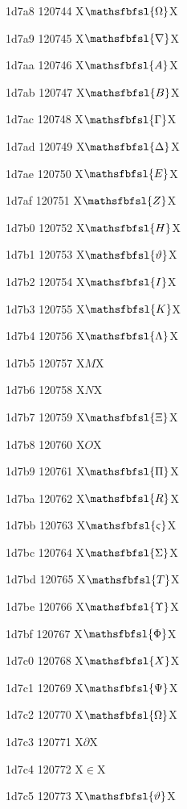 \documentclass[11pt]{article}
\begin{document}
1d7a8 120744 X{\ensuremath{\mathsfbfsl{\Omega}}}X

1d7a9 120745 X{\ensuremath{\mathsfbfsl{\nabla}}}X

1d7aa 120746 X{\ensuremath{\mathsfbfsl{A}}}X

1d7ab 120747 X{\ensuremath{\mathsfbfsl{B}}}X

1d7ac 120748 X{\ensuremath{\mathsfbfsl{\Gamma}}}X

1d7ad 120749 X{\ensuremath{\mathsfbfsl{\Delta}}}X

1d7ae 120750 X{\ensuremath{\mathsfbfsl{E}}}X

1d7af 120751 X{\ensuremath{\mathsfbfsl{Z}}}X

1d7b0 120752 X{\ensuremath{\mathsfbfsl{H}}}X

1d7b1 120753 X{\ensuremath{\mathsfbfsl{\vartheta}}}X

1d7b2 120754 X{\ensuremath{\mathsfbfsl{I}}}X

1d7b3 120755 X{\ensuremath{\mathsfbfsl{K}}}X

1d7b4 120756 X{\ensuremath{\mathsfbfsl{\Lambda}}}X

1d7b5 120757 X{\ensuremath{M}}X

1d7b6 120758 X{\ensuremath{N}}X

1d7b7 120759 X{\ensuremath{\mathsfbfsl{\Xi}}}X

1d7b8 120760 X{\ensuremath{O}}X

1d7b9 120761 X{\ensuremath{\mathsfbfsl{\Pi}}}X

1d7ba 120762 X{\ensuremath{\mathsfbfsl{R}}}X

1d7bb 120763 X{\ensuremath{\mathsfbfsl{\varsigma}}}X

1d7bc 120764 X{\ensuremath{\mathsfbfsl{\Sigma}}}X

1d7bd 120765 X{\ensuremath{\mathsfbfsl{T}}}X

1d7be 120766 X{\ensuremath{\mathsfbfsl{\Upsilon}}}X

1d7bf 120767 X{\ensuremath{\mathsfbfsl{\Phi}}}X

1d7c0 120768 X{\ensuremath{\mathsfbfsl{X}}}X

1d7c1 120769 X{\ensuremath{\mathsfbfsl{\Psi}}}X

1d7c2 120770 X{\ensuremath{\mathsfbfsl{\Omega}}}X

1d7c3 120771 X{\ensuremath{\partial}}X

1d7c4 120772 X{\ensuremath{\in}}X

1d7c5 120773 X{\ensuremath{\mathsfbfsl{\vartheta}}}X
\end{document}
